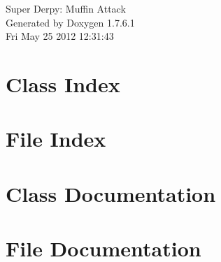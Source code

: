 \documentclass[a4paper]{book}
\begin{document}
\hypersetup{pageanchor=false,citecolor=blue}
\begin{titlepage}
\vspace*{7cm}
\begin{center}
{\Large \-Super \-Derpy\-: \-Muffin \-Attack }\\
\vspace*{1cm}
{\large \-Generated by Doxygen 1.7.6.1}\\
\vspace*{0.5cm}
{\small Fri May 25 2012 12:31:43}\\
\end{center}
\end{titlepage}
\clearemptydoublepage
{}
\tableofcontents
\clearemptydoublepage
{}
\hypersetup{pageanchor=true,citecolor=blue}
\chapter{\-Class \-Index}

\chapter{\-File \-Index}

\chapter{\-Class \-Documentation}













\chapter{\-File \-Documentation}




























\printindex
\end{document}
